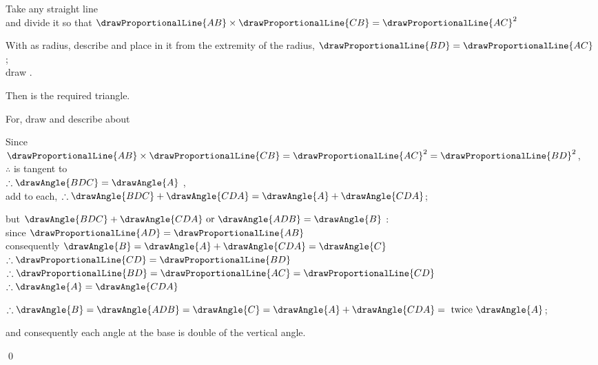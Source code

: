 \documentclass[booklanguage=english]{byrnebook}
\begin{document}
\begin{center}
Take any straight line  \\
and divide it so that $\drawProportionalLine{AB} \times \drawProportionalLine{CB} = \drawProportionalLine{AC}^2$ 

With  as radius, describe  and place in it from the extremity of the radius, $\drawProportionalLine{BD} = \drawProportionalLine{AC}$ ;\\
draw .

Then  is the required triangle.

For, draw  and describe  about  

Since $\drawProportionalLine{AB} \times \drawProportionalLine{CB} = \drawProportionalLine{AC}^2 = \drawProportionalLine{BD}^2$,\\
$\therefore$  is tangent to \circleF\ \\
$\therefore \drawAngle{BDC} = \drawAngle{A}$ ,\\
add  to each, $\therefore \drawAngle{BDC} + \drawAngle{CDA} = \drawAngle{A} + \drawAngle{CDA}$;

but $\drawAngle{BDC} + \drawAngle{CDA} \mbox{ or } \drawAngle{ADB} = \drawAngle{B}$ :\\
since $\drawProportionalLine{AD} = \drawProportionalLine{AB}$ \\
consequently $\drawAngle{B} = \drawAngle{A} + \drawAngle{CDA} = \drawAngle{C}$ \\
$\therefore \drawProportionalLine{CD} = \drawProportionalLine{BD}$ \\
$\therefore \drawProportionalLine{BD} = \drawProportionalLine{AC} = \drawProportionalLine{CD}$ \byref{\constref}\\
$\therefore \drawAngle{A} = \drawAngle{CDA}$ 

$\therefore \drawAngle{B} = \drawAngle{ADB} = \drawAngle{C} = \drawAngle{A} + \drawAngle{CDA} = \mbox{ twice } \drawAngle{A}$;

and consequently each angle at the base is double of the vertical angle.
\end{center}

\qed
\end{document}
